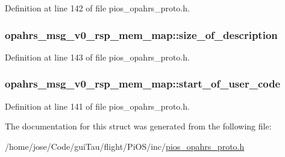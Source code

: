 Definition at line 142 of file pios\-\_\-opahrs\-\_\-proto.\-h.

\hypertarget{structopahrs__msg__v0__rsp__mem__map_a8a93f1c5a5a1f4606152370870fd7e21}{
\subsubsection[{size\-\_\-of\-\_\-description}]{ opahrs\-\_\-msg\-\_\-v0\-\_\-rsp\-\_\-mem\-\_\-map\-::size\-\_\-of\-\_\-description}}\label{structopahrs__msg__v0__rsp__mem__map_a8a93f1c5a5a1f4606152370870fd7e21}


Definition at line 143 of file pios\-\_\-opahrs\-\_\-proto.\-h.

\hypertarget{structopahrs__msg__v0__rsp__mem__map_a1936acd8a31ac8b0af3ca8c416e73597}{
\subsubsection[{start\-\_\-of\-\_\-user\-\_\-code}]{ opahrs\-\_\-msg\-\_\-v0\-\_\-rsp\-\_\-mem\-\_\-map\-::start\-\_\-of\-\_\-user\-\_\-code}}\label{structopahrs__msg__v0__rsp__mem__map_a1936acd8a31ac8b0af3ca8c416e73597}


Definition at line 141 of file pios\-\_\-opahrs\-\_\-proto.\-h.



The documentation for this struct was generated from the following file\-:\begin{DoxyCompactItemize}
\item 
/home/jose/\-Code/gui\-Tau/flight/\-Pi\-O\-S/inc/\hyperlink{pios__opahrs__proto_8h}{pios\-\_\-opahrs\-\_\-proto.\-h}\end{DoxyCompactItemize}
